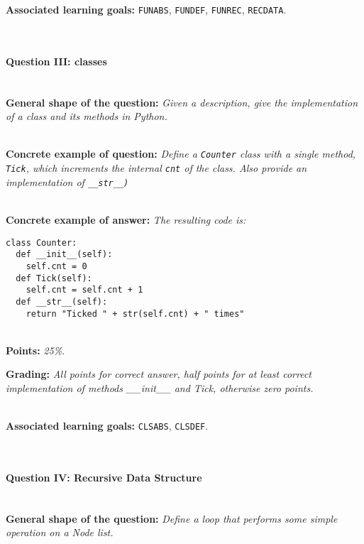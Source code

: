 \textbf{Associated learning goals:} \texttt{FUNABS}, \texttt{FUNDEF}, \texttt{FUNREC}, \texttt{RECDATA}.

\ \\ 

\paragraph{Question III: classes} \ \\

\textbf{General shape of the question:} \textit{Given a description, give the implementation of a class and its methods in Python.}

\ \\ 

\textbf{Concrete example of question:} \textit{Define a \texttt{Counter} class with a single method, \texttt{Tick}, which increments the internal \texttt{cnt} of the class. Also provide an implementation of \texttt{\_\_str\_\_)}}

\ \\ 

\textbf{Concrete example of answer:} \textit{The resulting code is:}

\begin{lstlisting}
class Counter:
  def __init__(self):
    self.cnt = 0
  def Tick(self):
    self.cnt = self.cnt + 1
  def __str__(self):
    return "Ticked " + str(self.cnt) + " times"
\end{lstlisting}

\ \\ 

\textbf{Points:} \textit{25\%.}


\textbf{Grading:} \textit{All points for correct answer, half points for at least correct implementation of methods \_\_init\_\_ and Tick, otherwise zero points.}

\ \\ 

\textbf{Associated learning goals:} \texttt{CLSABS}, \texttt{CLSDEF}.

\ \\

\paragraph{Question IV: Recursive Data Structure} \ \\

\textbf{General shape of the question:} \textit{Define a loop that performs some simple operation on a Node list.}

